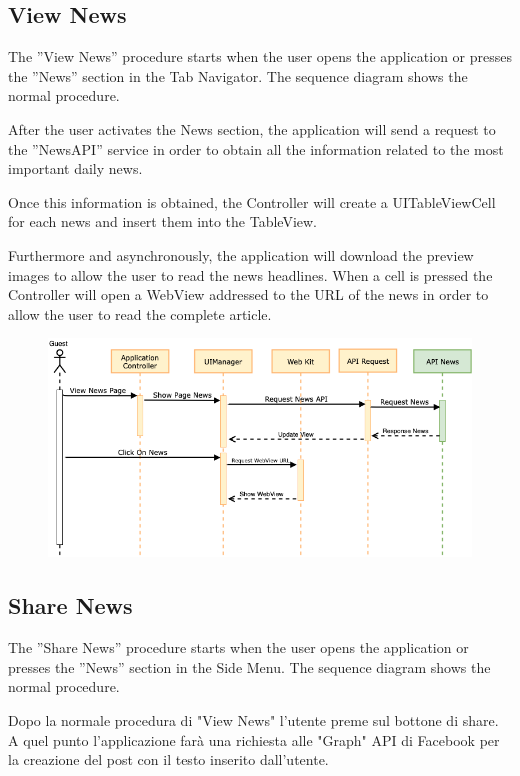 \documentclass[numbers=noenddot, 12pt, a4paper, oneside]{scrbook}
\begin{document}
\subsection*{View News}
The ”View News” procedure starts when the user opens the application or presses the ”News” section in the Tab Navigator. The sequence diagram shows the normal procedure.

After the user activates the News section, the application will send a request to the ”NewsAPI” service in order to obtain all the information related to the most important daily news.

Once this information is obtained, the Controller will create a UITableViewCell for each news and insert them into the TableView.

Furthermore and asynchronously, the application will download the preview images to allow the user to read the news headlines. When a cell is pressed the Controller will open a WebView addressed to the URL of the news in order to allow the user to read  the complete article.

\begin{figure}[H]
	\centering
	\includegraphics[width=1\textwidth]{images/Sequence/SequenceNews}
\end{figure}


\newpage

\subsection*{Share News}
The ”Share News” procedure starts when the user opens the application or presses the ”News” section in the Side Menu. The sequence diagram shows the normal procedure.

Dopo la normale procedura di "View News" l'utente preme sul bottone di share. A quel punto l'applicazione farà una richiesta alle "Graph" API di Facebook per la creazione del post con il testo inserito dall'utente.
\end{document}
